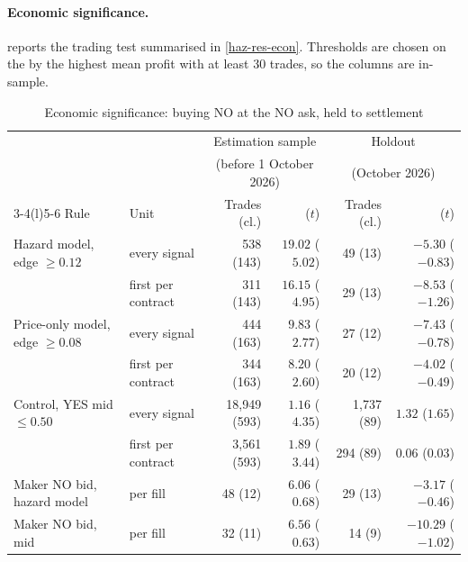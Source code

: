 \paragraph{Economic significance.}
 reports the trading test summarised in \cref{haz-res-econ}. Thresholds are chosen
on the \estim{} by the highest mean profit with at least 30 trades, so the \estim{} columns are
in-sample.

\begin{table}[ht]
\centering
\begin{threeparttable}
\caption{Economic significance: buying NO at the NO ask, held to settlement}\label{haz-tab-econ}
\footnotesize
\setlength{\tabcolsep}{4pt}
\begin{tabular}{@{}llrrrr@{}}
\toprule
 & & \multicolumn{2}{c}{Estimation sample} & \multicolumn{2}{c}{Holdout} \\
 & & \multicolumn{2}{c}{(before 1 October 2026)} & \multicolumn{2}{c}{(October 2026)} \\
\cmidrule(lr){3-4}\cmidrule(l){5-6}
Rule & Unit & Trades (cl.) & \textcent{} ($t$) & Trades (cl.) & \textcent{} ($t$) \\
\midrule
Hazard model, edge $\ge 0.12$  & every signal  &    538 (143) & $19.02$ ($5.02$) &     49 (13) & $-5.30$ ($-0.83$) \\
                               & first per contract & 311 (143) & $16.15$ ($4.95$) &   29 (13) & $-8.53$ ($-1.26$) \\
Price-only model, edge $\ge 0.08$ & every signal &   444 (163) & $9.83$ ($2.77$)  &     27 (12) & $-7.43$ ($-0.78$) \\
                               & first per contract & 344 (163) & $8.20$ ($2.60$)  &   20 (12) & $-4.02$ ($-0.49$) \\
Control, YES mid $\le 0.50$    & every signal  & 18{,}949 (593) & $1.16$ ($4.35$) & 1{,}737 (89) & $1.32$ ($1.65$) \\
                               & first per contract & 3{,}561 (593) & $1.89$ ($3.44$) & 294 (89) & $0.06$ ($0.03$) \\
Maker NO bid, hazard model     & per fill      &     48 (12)  & $6.06$ ($0.68$)  &     29 (13) & $-3.17$ ($-0.46$) \\
Maker NO bid, mid              & per fill      &     32 (11)  & $6.56$ ($0.63$)  &     14 (9)  & $-10.29$ ($-1.02$) \\
\bottomrule
\end{tabular}
\begin{tablenotes}\footnotesize

\end{tablenotes}
\end{threeparttable}
\end{table}
